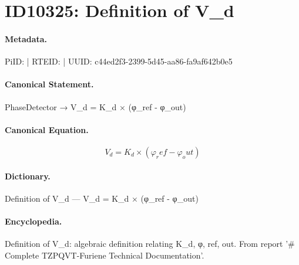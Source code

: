 \section*{ID10325: Definition of V\_d}
\paragraph{Metadata.}
PiID:  | RTEID:  | UUID: c44ed2f3-2399-5d45-aa86-fa9af642b0e5

\paragraph{Canonical Statement.}
PhaseDetector → V\_d = K\_d × (φ\_ref - φ\_out)

\paragraph{Canonical Equation.}
\[
V_d = K_d × (φ_ref - φ_out)
\]

\paragraph{Dictionary.}
Definition of V\_d — V\_d = K\_d × (φ\_ref - φ\_out)

\paragraph{Encyclopedia.}
Definition of V\_d: algebraic definition relating K\_d, φ, ref, out. From report '\# Complete TZPQVT-Furiene Technical Documentation'.
